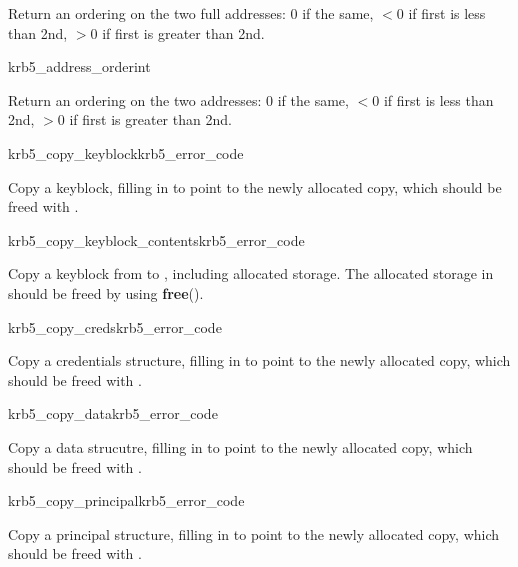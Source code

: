 Return an ordering on the two full addresses:  0 if the same,
$< 0$ if first is less than 2nd, $> 0$ if first is greater than 2nd.

\begin{funcdecl}{krb5_address_order}{int}{\funcin}
\end{funcdecl}

Return an ordering on the two addresses:  0 if the same,
$< 0$ if first is less than 2nd, $> 0$ if first is greater than 2nd.

\begin{funcdecl}{krb5_copy_keyblock}{krb5_error_code}{\funcin}
\funcout
{}
\end{funcdecl}

Copy a keyblock, filling in  to point to the newly
allocated copy, which should be freed with
. 

\begin{funcdecl}{krb5_copy_keyblock_contents}{krb5_error_code}{\funcin}
\funcout
{}
\end{funcdecl}

Copy a keyblock from  to , including
allocated storage.  The allocated storage in  should be
freed by using {\bf free}().

\begin{funcdecl}{krb5_copy_creds}{krb5_error_code}{\funcin}
\funcout
{}
\end{funcdecl}

Copy a credentials structure, filling in  to point
to the newly allocated copy, which should be freed with
.

\begin{funcdecl}{krb5_copy_data}{krb5_error_code}{\funcin}
\funcout
{}
\end{funcdecl}

Copy a data strucutre, filling in  to point to the
newly allocated copy, which should be freed with .

\begin{funcdecl}{krb5_copy_principal}{krb5_error_code}{\funcin}
\funcout
{}
\end{funcdecl}
Copy a principal structure, filling in  to point to
the newly allocated copy, which should be freed with
.

